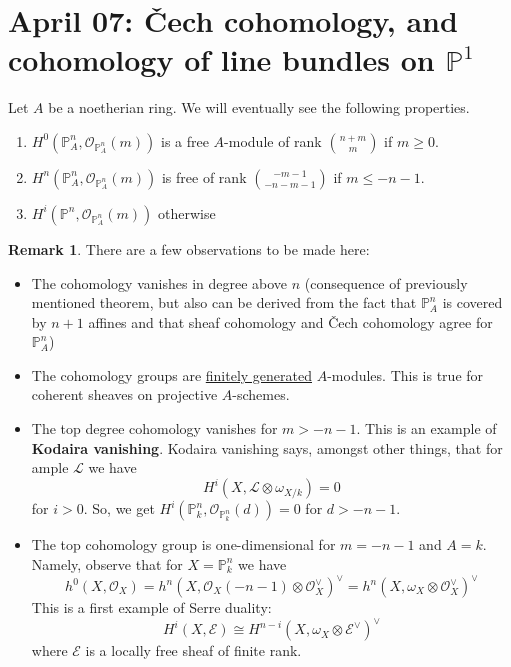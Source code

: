 \documentclass[10pt,reqno]{amsart}
\theoremstyle{definition}
\newtheorem{remark}[theorem]{Remark}
\theoremstyle{remark}
\numberwithin{equation}{section}
\numberwithin{theorem}{section}
\newcommand*{\red}{\textcolor{red}}
\newcommand{\OO}{{\mathcal O}}
\newcommand{\LL}{{\mathscr L}}
\newcommand{\PP}{{\mathbb P}}
\begin{document}
\section{April 07: \v Cech cohomology, and cohomology of line bundles on $\PP^1$}

Let $A$ be a noetherian ring. We will eventually see the following properties.
\begin{enumerate} 
\item $H^0(\PP^n_A, \OO_{\PP^n_A}(m))$ is a free $A$-module of rank $\binom{n+m}{m}$ if $m \ge 0$.
\item $H^n(\PP^n_A, \OO_{\PP^n_A}(m))$ is free of rank $\binom{-m-1}{-n-m-1}$ if $m \le -n-1$. %
\item $H^i(\PP^n, \OO_{\PP^n_A}(m))$ otherwise
\end{enumerate}

\begin{remark}
There are a few observations to be made here:
\begin{itemize}
\item The cohomology vanishes in degree above $n$ (consequence of previously mentioned theorem, but also can be derived from the fact that $\PP^n_A$ is covered by $n+1$ affines and that sheaf cohomology and \v Cech cohomology agree for $\PP^n_A$)
\item The cohomology groups are \underline{finitely generated} $A$-modules. This is true for coherent sheaves on projective $A$-schemes.
\item The top degree cohomology vanishes for $m > -n-1$. This is an example of \textbf{Kodaira vanishing}. Kodaira vanishing says, amongst other things, that for ample $\LL$ we have%
\[H^i(X,\LL \otimes \omega_{X/k}) = 0 \]
for $i > 0$. So, we get $H^i(\PP^n_k, \OO_{\PP^n_k}(d)) = 0$ for $d > -n-1$.
\item The top cohomology group is one-dimensional for $m = -n-1$ and $A = k$. Namely, observe that for $X = \PP^n_k$ we have
\[h^0(X,\OO_{X}) = h^n(X, \OO_{X}(-n-1) \otimes \OO_X^{\vee})^{\vee} = h^n(X,\omega_X \otimes \OO_X^{\vee})^{\vee}\]
This is a first example of Serre duality:
\[H^i(X,\mathscr{E}) \cong H^{n-i}(X, \omega_X \otimes \mathscr{E}^{\vee})^{\vee}\]
where $\mathscr{E}$ is a locally free sheaf of finite rank.
\end{itemize}
\end{remark}
\end{document}

